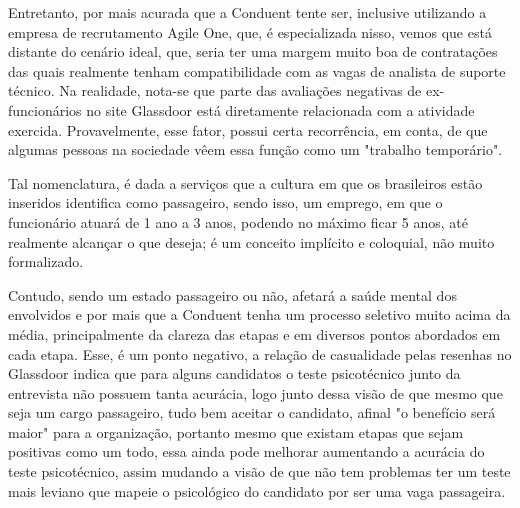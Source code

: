\documentclass[12pt]{article}
\begin{document}
Entretanto, por mais acurada que a Conduent tente ser, inclusive utilizando a empresa de recrutamento Agile One, que, é especializada nisso, vemos que está distante do cenário ideal, que, seria ter uma margem muito boa de contratações das quais realmente tenham compatibilidade com as vagas de analista de suporte técnico. Na realidade, nota-se que parte das avaliações negativas de ex-funcionários no site Glassdoor está diretamente relacionada com a atividade exercida. Provavelmente, esse fator, possui certa recorrência, em conta, de que algumas pessoas na sociedade vêem essa função como um "trabalho temporário".

Tal nomenclatura, é dada a serviços que a cultura em que os brasileiros estão inseridos identifica como passageiro, sendo isso, um emprego, em que o funcionário atuará de 1 ano a 3 anos, podendo no máximo ficar 5 anos, até realmente alcançar o que deseja; é um conceito implícito e coloquial, não muito formalizado. 

Contudo, sendo um estado passageiro ou não, afetará a saúde mental dos envolvidos e por mais que a Conduent tenha um processo seletivo muito acima da média, principalmente da clareza das etapas e em diversos pontos abordados em cada etapa. Esse, é um ponto negativo, a relação de casualidade pelas resenhas no Glassdoor indica que para alguns candidatos o teste psicotécnico junto da entrevista não possuem tanta acurácia, logo junto dessa visão de que mesmo que seja um cargo passageiro, tudo bem aceitar o candidato, afinal "o benefício será maior" para a organização, portanto mesmo que existam etapas que sejam positivas como um todo, essa ainda pode melhorar aumentando a acurácia do teste psicotécnico, assim mudando a visão de que não tem problemas ter um teste mais leviano que mapeie o psicológico do candidato por ser uma vaga passageira.
\end{document}
